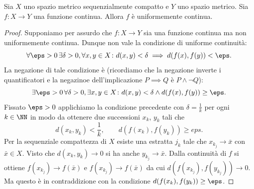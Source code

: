 \begin{theorem}
  \label{th:HeineCantor}
Sia $X$ uno spazio metrico sequenzialmente compatto e $Y$ uno spazio metrico.
Sia $f\colon X\to Y$ una funzione continua. 
Allora $f$ è uniformemente continua.
\end{theorem}
%
\begin{proof}
Supponiamo per assurdo che $f\colon X\to Y$ sia una funzione continua 
ma non uniformemente continua. Dunque non vale la condizione di uniforme
continuità:
\[
 \forall \eps>0\, \exists \delta>0, \forall x,y\in X\colon 
  d(x,y)<\delta \implies d(f(x),f(y))< \eps. 
\]
La negazione di tale condizione è 
(ricordiamo che la negazione inverte i quantificatori 
e la negazinoe dell'implicazione $P\implies Q$ è $P\land \lnot Q$):
\[
 \exists \eps>0\, \forall \delta>0, \exists x,y\in X\colon
 d(x,y)<\delta \land d(f(x),f(y))\ge \eps.
\]
Fissato $\eps>0$ applichiamo la condizione precedente 
con $\delta = \frac 1 k$ per ogni $k\in \NN$ in modo da ottenere 
due successioni $x_k$, $y_k$ tali che
\[
  d(x_k,y_k)< \frac 1 k, \qquad d(f(x_k),f(y_k))\ge eps.
\]
Per la sequenziale compattezza di $X$ esiste una estratta $j_k$ 
tale che $x_{k_j}\to \bar x$ con $\bar x\in X$.
Visto che $d(x_k,y_k)\to 0$ si ha anche $y_{k_j}\to \bar x$.
Dalla continuità di $f$ si ottiene $f(x_{k_j})\to f(\bar x)$ 
e $f(x_{k_j})\to f(\bar x)$ da cui $d(f(x_{k_j}),f(y_{k_j}))\to 0$.
Ma questo è in contraddizione con la condizione $d(f(x_k),f(y_k))\ge \eps$.
\end{proof}

